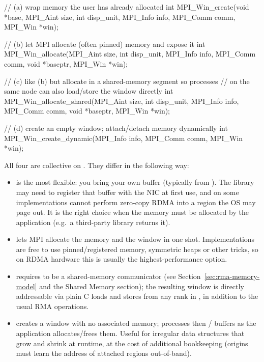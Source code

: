 \begin{codeblock}[language=C]
// (a) wrap memory the user has already allocated
int MPI_Win_create(void *base, MPI_Aint size, int disp_unit,
                   MPI_Info info, MPI_Comm comm, MPI_Win *win);

// (b) let MPI allocate (often pinned) memory and expose it
int MPI_Win_allocate(MPI_Aint size, int disp_unit, MPI_Info info,
                     MPI_Comm comm, void *baseptr, MPI_Win *win);

// (c) like (b) but allocate in a shared-memory segment so processes
//     on the same node can also load/store the window directly
int MPI_Win_allocate_shared(MPI_Aint size, int disp_unit, MPI_Info info,
                            MPI_Comm comm, void *baseptr, MPI_Win *win);

// (d) create an empty window; attach/detach memory dynamically
int MPI_Win_create_dynamic(MPI_Info info, MPI_Comm comm, MPI_Win *win);
\end{codeblock}

All four are collective on . They differ in the following way:

\begin{itemize}
    \item {} is the most flexible: you bring your own buffer (typically from ). The library may need to register that buffer with the NIC at first use, and on some implementations cannot perform zero-copy RDMA into a region the OS may page out. It is the right choice when the memory must be allocated by the application (e.g.\ a third-party library returns it).
    \item {} lets MPI allocate the memory and the window in one shot. Implementations are free to use pinned/registered memory, symmetric heaps or other tricks, so on RDMA hardware this is usually the highest-performance option.
    \item {} requires  to be a shared-memory communicator (see Section~\ref{sec:rma-memory-model} and the Shared Memory section); the resulting window is directly addressable via plain C loads and stores from any rank in , in addition to the usual RMA operations.
    \item {} creates a window with no associated memory; processes then / buffers as the application allocates/frees them. Useful for irregular data structures that grow and shrink at runtime, at the cost of additional bookkeeping (origins must learn the address of attached regions out-of-band).
\end{itemize}

